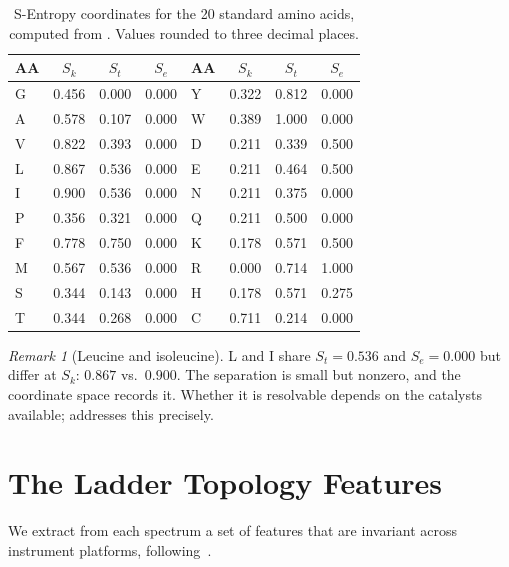 \documentclass[11pt,a4paper]{article}
\theoremstyle{definition}
\theoremstyle{remark}
\newtheorem{remark}[theorem]{Remark}
\newcommand{\Sk}{S_k}
\newcommand{\St}{S_t}
\newcommand{\Se}{S_e}
\begin{document}
\begin{table}[t]
\centering
\small
\caption{S-Entropy coordinates for the 20 standard amino acids, computed
from . Values rounded to three decimal places.}
\label{tab:aa-coords}
\begin{tabular}{@{}lccclccc@{}}
\toprule
\textbf{AA} & $\Sk$ & $\St$ & $\Se$ &
\textbf{AA} & $\Sk$ & $\St$ & $\Se$ \\
\midrule
G & 0.456 & 0.000 & 0.000 & Y & 0.322 & 0.812 & 0.000 \\
A & 0.578 & 0.107 & 0.000 & W & 0.389 & 1.000 & 0.000 \\
V & 0.822 & 0.393 & 0.000 & D & 0.211 & 0.339 & 0.500 \\
L & 0.867 & 0.536 & 0.000 & E & 0.211 & 0.464 & 0.500 \\
I & 0.900 & 0.536 & 0.000 & N & 0.211 & 0.375 & 0.000 \\
P & 0.356 & 0.321 & 0.000 & Q & 0.211 & 0.500 & 0.000 \\
F & 0.778 & 0.750 & 0.000 & K & 0.178 & 0.571 & 0.500 \\
M & 0.567 & 0.536 & 0.000 & R & 0.000 & 0.714 & 1.000 \\
S & 0.344 & 0.143 & 0.000 & H & 0.178 & 0.571 & 0.275 \\
T & 0.344 & 0.268 & 0.000 & C & 0.711 & 0.214 & 0.000 \\
\bottomrule
\end{tabular}
\end{table}

\begin{remark}[Leucine and isoleucine]
\label{rem:li}
L and I share $\St=0.536$ and $\Se=0.000$ but differ at $\Sk$:
$0.867$ vs.\ $0.900$. The separation is small but nonzero, and the
coordinate space records it. Whether it is resolvable depends on the
catalysts available;  addresses this precisely.
\end{remark}

\section{The Ladder Topology Features}
\label{sec:topology}

We extract from each spectrum a set of features that are invariant
across instrument platforms, following~\citet{sachikonye2025fragmentation}.
\end{document}
